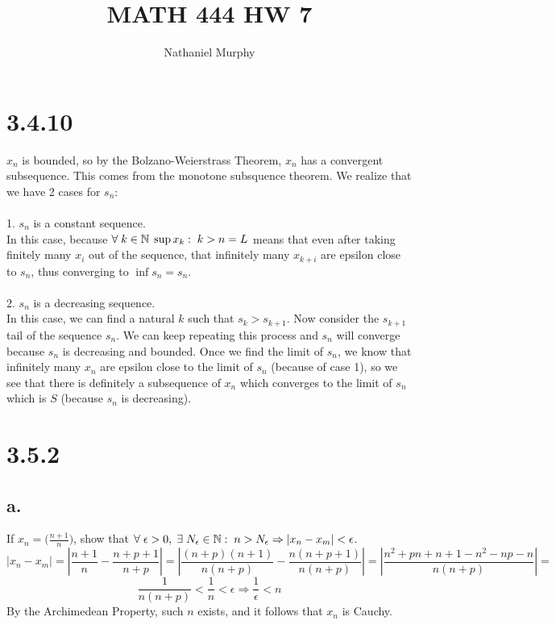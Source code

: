 \documentclass[11pt]{article}
\title{\textbf{MATH 444 HW 7}}
\author{Nathaniel Murphy}
\date{}
\begin{document}
\maketitle

\section*{3.4.10}
$x_n$ is bounded, so by the Bolzano-Weierstrass Theorem, $x_n$ has a convergent subsequence. This comes from the monotone subsquence theorem. We realize that we have 2 cases for $s_n$: \\
\\
1. $s_n$ is a constant sequence. \\
In this case, because $\forall \hspace{1mm}k \in \mathbb{N}\hspace{1mm} \sup{x_k:\hspace{1mm}k>n}=L$ means that even after taking finitely many $x_i$ out of the sequence, that infinitely many $x_{k+i}$ are epsilon close to $s_n$, thus converging to $\inf{s_n}=s_n$. \\
\\
2. $s_n$ is a decreasing sequence. \\
In this case, we can find a natural $k$ such that $s_k>s_{k+1}$. Now consider the $s_{k+1}$ tail of the sequence $s_n$. We can keep repeating this process and $s_n$ will converge because $s_n$ is decreasing and bounded. Once we find the limit of $s_n$, we know that infinitely many $x_n$ are epsilon close to the limit of $s_n$ (because of case 1), so we see that there is definitely a subsequence of $x_n$ which converges to the limit of $s_n$ which is $S$ (because $s_n$ is decreasing).

\section*{3.5.2}
\subsection*{a.}
If $x_n=\big(\frac{n+1}{n}\big)$, show that $\forall \hspace{1mm} \epsilon > 0, \hspace{1mm} \exists \hspace{1mm} N_{\epsilon}\in\mathbb{N}:\hspace{1mm}n>N_{\epsilon} \Rightarrow|x_n-x_m|<\epsilon$.
\[|x_n-x_m|=\left|\frac{n+1}{n}-\frac{n+p+1}{n+p}\right|=\left|\frac{(n+p)(n+1)}{n(n+p)}-\frac{n(n+p+1)}{n(n+p)}\right|=\left|\frac{n^2+pn+n+1-n^2-np-n}{n(n+p)}\right|=\]
\[\frac{1}{n(n+p)}<\frac{1}{n}<\epsilon \Rightarrow \frac{1}{\epsilon}<n\]
By the Archimedean Property, such $n$ exists, and it follows that $x_n$ is Cauchy.
\end{document}
